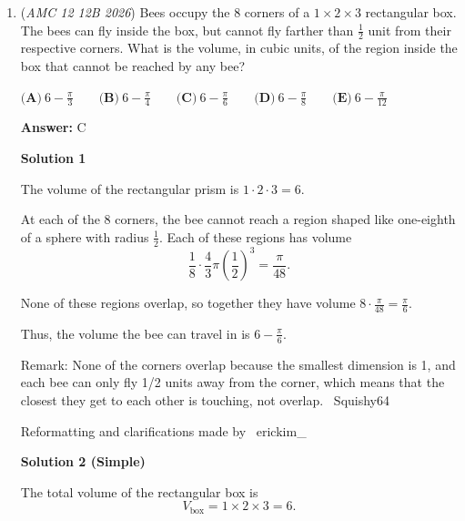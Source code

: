 \begin{enumerate}
 \[=\frac{622080}{540}\]

 \[=\boxed{1152}\]

 After some arithmetic we get 

 
 \[\boxed{m_L=1152\text{ grams}}.\]

 Therefore, the answer is

 
 \[\boxed{\textbf{(D)}\ 1152}.\]



	\item (\textit{AMC 12 12B 2026}) Bees occupy the $8$ corners of a $1 \times 2 \times 3$ rectangular box. The bees can fly inside the box, but cannot fly farther than $\frac{1}{2}$ unit from their respective corners. What is the volume, in cubic units, of the region inside the box that cannot be reached by any bee?


 $\textbf{(A)}\   6 - \frac{\pi}{3}  \qquad                 \textbf{(B)}\   6 - \frac{\pi}{4}  \qquad                 \textbf{(C)}\   6 - \frac{\pi}{6}  \qquad                 \textbf{(D)}\   6 - \frac{\pi}{8}  \qquad                 \textbf{(E)}\   6 - \frac{\pi}{12}$

 \textbf{Answer: }C



\textbf{Solution 1}

The volume of the rectangular prism is $1 \cdot 2 \cdot 3 = 6$.

 At each of the $8$ corners, the bee cannot reach a region shaped like one-eighth of a sphere with radius $\frac{1}{2}$. Each of these regions has volume
 \[\frac{1}{8} \cdot \frac{4}{3}\pi\left(\frac{1}{2}\right)^3 = \frac{\pi}{48}.\]

 None of these regions overlap, so together they have volume $8 \cdot \frac{\pi}{48} = \frac{\pi}{6}$.

 Thus, the volume the bee can travel in is $\boxed{6 - \frac{\pi}{6}}$.

 Remark: None of the corners overlap because the smallest dimension is 1, and each bee can only fly 1/2 units away from the corner, which means that the closest they get to each other is touching, not overlap. ~Squishy64

 Reformatting and clarifications made by ~erickim\_

 



\textbf{Solution 2 (Simple)}

The total volume of the rectangular box is
 \[V_{\text{box}} = 1 \times 2 \times 3 = 6.\]


\end{enumerate}
